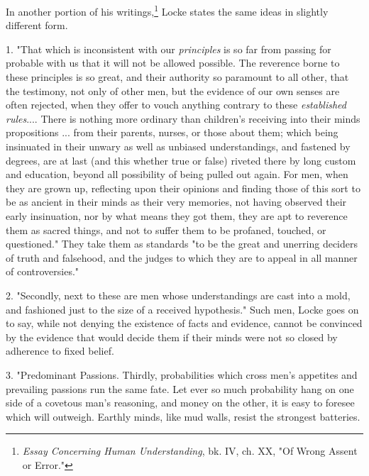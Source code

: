 \documentclass[letterpaper]{book}
\begin{document}
In another portion of his
writings,\footnote{\emph{Essay Concerning Human Understanding}, bk. IV, ch. XX, "Of Wrong Assent or Error."}
Locke states the same ideas in slightly different form.


1. "That which is inconsistent with our \emph{principles} is so far from
passing for probable with us that it will not be allowed possible. The
reverence borne to these principles is so great, and their authority so
paramount to all other, that the testimony, not only of other men, but
the evidence of our own senses are often rejected, when they offer to
vouch anything contrary to these \emph{established rules}.... There is
nothing more ordinary than children's receiving into their minds
propositions ... from their parents, nurses, or those about them; which
being insinuated in their unwary as well as unbiased understandings, and
fastened by degrees, are at last (and this whether true or false)
riveted there by long custom and education, beyond all possibility of
being pulled out again. For men, when they are grown up, reflecting upon
their opinions and finding those of this sort to be as ancient in their
minds as their very memories, not having observed their early
insinuation, nor by what means they got them, they are apt to reverence
them as sacred things, and not to suffer them to be profaned, touched,
or questioned." They take them as standards "to be the great and
unerring deciders of truth and falsehood, and the judges to which they
are to appeal in all manner of controversies."


2. "Secondly, next to these are men whose understandings are cast into a
mold, and fashioned just to the size of a received hypothesis." Such
men, Locke goes on to say, while not denying the existence of facts and
evidence, cannot be convinced by the evidence
that
would decide them if their minds were not so closed by adherence to
fixed belief.


3. "Predominant Passions. Thirdly, probabilities which cross men's
appetites and prevailing passions run the same fate. Let ever so much
probability hang on one side of a covetous man's reasoning, and money on
the other, it is easy to foresee which will outweigh. Earthly minds,
like mud walls, resist the strongest batteries.

\end{document}
